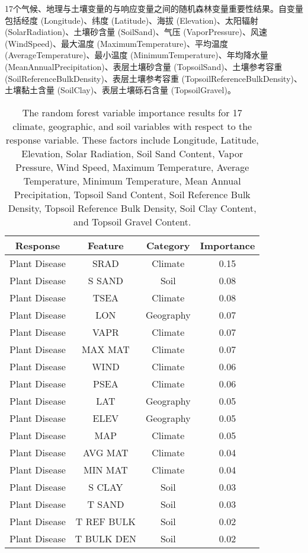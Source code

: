 \documentclass[AutoFakeBold]{LZUThesis-PgD&PhD}
\begin{document}
	
	
	\begin{table}[H]
		\caption{17个气候、地理与土壤变量的与响应变量之间的随机森林变量重要性结果。自变量包括经度 (Longitude)、纬度 (Latitude)、海拔 (Elevation)、太阳辐射 (SolarRadiation)、土壤砂含量 (SoilSand)、气压 (VaporPressure)、风速 (WindSpeed)、最大温度 (MaximumTemperature)、平均温度 (AverageTemperature)、最小温度 (MinimumTemperature)、年均降水量 (MeanAnnualPrecipitation)、表层土壤砂含量 (TopsoilSand)、土壤参考容重 (SoilReferenceBulkDensity)、表层土壤参考容重 (TopsoilReferenceBulkDensity)、土壤黏土含量 (SoilClay)、表层土壤砾石含量 (TopsoilGravel)。}
		\caption*{The random forest variable importance results for 17 climate, geographic, and soil variables with respect to the response variable. These factors include Longitude, Latitude, Elevation, Solar Radiation, Soil Sand Content, Vapor Pressure, Wind Speed, Maximum Temperature, Average Temperature, Minimum Temperature, Mean Annual Precipitation, Topsoil Sand Content, Soil Reference Bulk Density, Topsoil Reference Bulk Density, Soil Clay Content, and Topsoil Gravel Content.}
		\label{tab:feature_importance}
		\begin{tabular}{cccc}
			\toprule
			Response & Feature & Category & Importance \\
			\midrule
			Plant Disease & SRAD & Climate & 0.15 \\
			Plant Disease & S SAND & Soil & 0.08 \\
			Plant Disease & TSEA & Climate & 0.08 \\
			Plant Disease & LON & Geography & 0.07 \\
			Plant Disease & VAPR & Climate & 0.07 \\
			Plant Disease & MAX MAT & Climate & 0.07 \\
			Plant Disease & WIND & Climate & 0.06 \\
			Plant Disease & PSEA & Climate & 0.06 \\
			Plant Disease & LAT & Geography & 0.05 \\
			Plant Disease & ELEV & Geography & 0.05 \\
			Plant Disease & MAP & Climate & 0.05 \\
			Plant Disease & AVG MAT & Climate & 0.04 \\
			Plant Disease & MIN MAT & Climate & 0.04 \\
			Plant Disease & S CLAY & Soil & 0.03 \\
			Plant Disease & T SAND & Soil & 0.03 \\
			Plant Disease & T REF BULK & Soil & 0.02 \\
			Plant Disease & T BULK DEN & Soil & 0.02 \\
			\bottomrule
		\end{tabular}
	\end{table}
	
\end{document}
